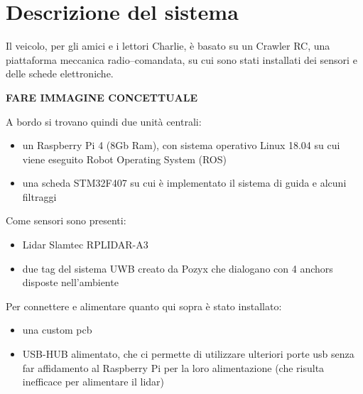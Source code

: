 
\section{Descrizione del sistema}
 
Il veicolo, per gli amici e i lettori Charlie, \`e basato su un Crawler RC, una piattaforma meccanica radio--comandata, su cui sono stati installati dei sensori e delle schede elettroniche. 

\textbf{FARE IMMAGINE CONCETTUALE}

A bordo si trovano quindi due unit\`a centrali:
\begin{itemize}
	\item un Raspberry Pi 4 (8Gb Ram), con sistema operativo Linux 18.04 su cui viene eseguito Robot Operating System (ROS)
	\item una scheda STM32F407 su cui è implementato il sistema di guida e alcuni filtraggi
\end{itemize}

Come sensori sono presenti:
\begin{itemize}
	\item Lidar Slamtec RPLIDAR-A3
	
	\item due tag del sistema UWB creato da Pozyx che dialogano con 4 anchors disposte nell'ambiente
\end{itemize}





Per connettere e alimentare quanto qui sopra \`e stato installato:
\begin{itemize}
	\item una custom pcb 
	
	\item USB-HUB alimentato, che ci permette di utilizzare ulteriori porte usb senza far affidamento al Raspberry Pi per la loro alimentazione (che risulta inefficace per alimentare il lidar)
\end{itemize}